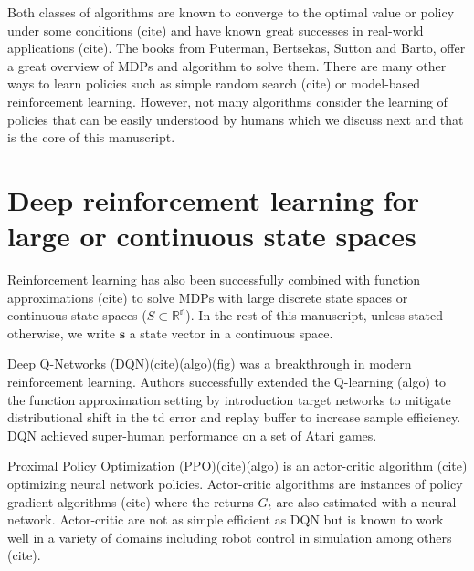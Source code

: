 Both classes of algorithms are known to converge to the optimal value or policy under some conditions (cite) and have known great successes in real-world applications (cite).
The books from Puterman, Bertsekas, Sutton and Barto, offer a great overview of MDPs and algorithm to solve them.
There are many other ways to learn policies such as simple random search (cite) or model-based reinforcement learning. 
However, not many algorithms consider the learning of policies that can be easily understood by humans which we discuss next and that is the core of this manuscript.


\section{Deep reinforcement learning for large or continuous state spaces}

Reinforcement learning has also been successfully combined with function approximations (cite) to solve MDPs with large discrete state spaces or continuous state spaces ($S \subset \mathbb{R^n}$).
In the rest of this manuscript, unless stated otherwise, we write $\boldsymbol{s}$ a state vector in a continuous space.

Deep Q-Networks (DQN)(cite)(algo)(fig) was a breakthrough in modern reinforcement learning. Authors successfully extended the Q-learning (algo) to the function approximation setting by introduction target networks to mitigate distributional shift in the td error and replay buffer to increase sample efficiency.
DQN achieved super-human performance on a set of Atari games.

Proximal Policy Optimization (PPO)(cite)(algo) is an actor-critic algorithm (cite) optimizing neural network policies. 
Actor-critic algorithms are instances of policy gradient algorithms (cite) where the returns $G_t$ are also estimated with a neural network. 
Actor-critic are not as simple efficient as DQN but is known to work well in a variety of domains including robot control in simulation among others (cite).

